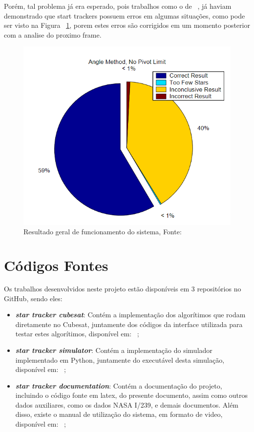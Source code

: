 Porém, tal problema já era esperado, pois trabalhos como o de ~\cite{Cole},
já haviam demonstrado que start trackers possuem erros em algumas situações, como pode ser visto na Figura ~\ref{fig:me_salva},
porem estes erros são corrigidos em um momento posterior com a analise do proximo frame.

\begin{figure}[H]
    \centering
    \includegraphics[width=.8\textwidth]{images/me_salva.png}
    \caption{Resultado geral de funcionamento do sistema, Fonte: ~\cite{Cole}}
    \label{fig:me_salva}
\end{figure}



\section{Códigos Fontes}

Os trabalhos desenvolvidos neste projeto estão disponíveis em 3 repositórios no GitHub, sendo eles:

\begin{itemize}
    \item \textbf{\textit{star tracker cubesat}}: Contém a implementação dos algorítimos que rodam diretamente no Cubesat, 
    juntamente dos códigos da interface utilizada para testar estes algorítimos, disponível em: ~\cite[]{Parreira_star_tracker_cubesat_2022};
    \item \textbf{\textit{star tracker simulator}}: Contém a implementação do simulador implementado em Python, 
    juntamente do executável desta simulação, disponível em: ~\cite[]{Parreira_Star_Tracker_Simulator_2022};
    \item \textbf{\textit{star tracker documentation}}: Contém a documentação do projeto, 
    incluindo o código fonte em latex, do presente documento, assim como outros dados auxiliares, 
    como os dados NASA I/239, e demais documentos. 
    Além disso, existe o manual de utilização do sistema, 
    em formato de video, disponível em: ~\cite[]{Parreira_Star_Tracker_Cocumentation_2022};
\end{itemize}